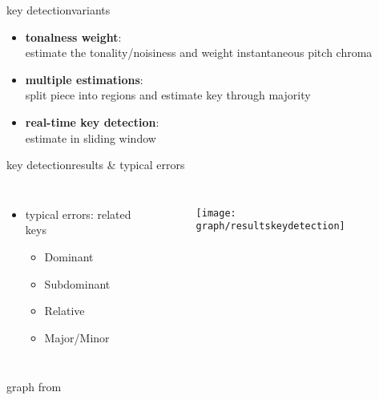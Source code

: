         \begin{frame}{key detection}{variants}
            \begin{itemize}
                \item	\textbf{tonalness weight}:\\ estimate the tonality/noisiness and weight instantaneous pitch chroma
                \item<2->	\textbf{multiple estimations}:\\ split piece into regions and estimate key through majority
                \item<3->	\textbf{real-time key detection}:\\ estimate in sliding window
            \end{itemize}
        \end{frame}
        \begin{frame}{key detection}{results \& typical errors}
            \begin{columns}[T]
                \begin{itemize}
                    \item	typical errors: related keys
                        \begin{itemize}
                            \item	Dominant
                            \item	Subdominant
                            \item	Relative
                            \item	Major/Minor
                        \end{itemize}
                \end{itemize}
                \begin{figure}
                    \centering
                        \texttt{[image: graph/resultskeydetection]}
                \end{figure}
            \end{columns}
            \begin{flushright}
                graph from 
            \end{flushright}
        \end{frame}
                
